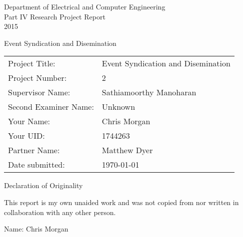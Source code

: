\begin{titlepage}


\vspace*{15em}


\centering

{\LARGE Department of Electrical and Computer Engineering\\
Part IV Research Project Report\\
2015}

{\LARGE Event Syndication and Disemination}

\hspace{2em}

\begin{table*}[h]
\centering
\begin{tabular}{ll}
Project Title: & Event Syndication and Disemination \\
Project Number: & 2 \\
Supervisor Name: & Sathiamoorthy Manoharan \\
Second Examiner Name: & Unknown \\
Your Name: & Chris Morgan \\
Your UID: & 1744263 \\
Partner Name: & Matthew Dyer \\
Date submitted: & \today \\

\end{tabular}
\end{table*}
\begin{table}


\end{table}
\pagebreak

\vspace*{25em}

{\Large Declaration of Originality}

\hspace{5em}

This report is my own unaided work and was not copied from 
nor written in collaboration with any other person.

Name: Chris Morgan 


\end{titlepage}